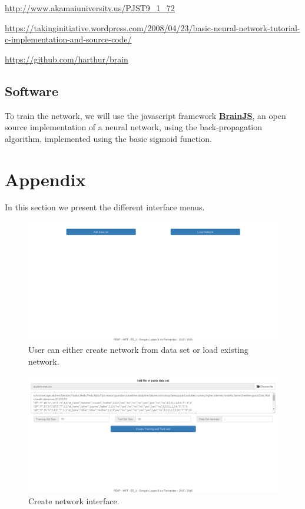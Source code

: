 \documentclass[11pt]{article}
\begin{document}
\url{http://www.akamaiuniversity.us/PJST9_1_72}

\url{https://takinginitiative.wordpress.com/2008/04/23/basic-neural-network-tutorial-c-implementation-and-source-code/}

\url{https://github.com/harthur/brain}

\subsection{Software}

To train the network, we will use the javascript framework \href{https://github.com/harthur/brain}{\textbf{BrainJS}}, an open source implementation of a neural network, using the back-propagation algorithm, implemented using the basic sigmoid function.

\newpage
\section{Appendix}
In this section we present the different interface menus.

\begin{figure}[H]
\label{fig:example}
\includegraphics[scale=0.3]{interface0.png}
\centering
\caption{User can either create network from data set or load existing network.}
\end{figure}

\begin{figure}[H]
\label{fig:example}
\includegraphics[scale=0.3]{interface1.png}
\centering
\caption{Create network interface.}
\end{figure}
\end{document}
